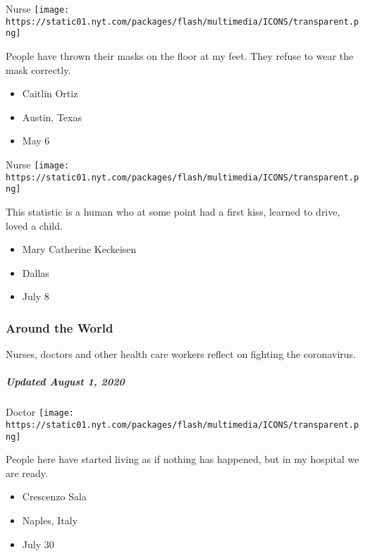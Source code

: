 \protect\hyperlink{item-caitlin-ortiz}{}

Nurse
\texttt{[image: https://static01.nyt.com/packages/flash/multimedia/ICONS/transparent.png]}

People have thrown their masks on the floor at my feet. They refuse to
wear the mask correctly.

\begin{itemize}
\tightlist
\item
  Caitlin Ortiz
\item
  Austin, Texas
\item
  May 6
\end{itemize}

\protect\hyperlink{item-mary-catherine-keckeisen}{}

Nurse
\texttt{[image: https://static01.nyt.com/packages/flash/multimedia/ICONS/transparent.png]}

This statistic is a human who at some point had a first kiss, learned to
drive, loved a child.

\begin{itemize}
\tightlist
\item
  Mary Catherine Keckeisen
\item
  Dallas
\item
  July 8
\end{itemize}

\hypertarget{around-the-world}{%
\subsubsection{Around the World}\label{around-the-world}}

Nurses, doctors and other health care workers reflect on fighting the
coronavirus.

\hypertarget{updated-august-1-2020-1}{%
\subparagraph{Updated August 1, 2020}\label{updated-august-1-2020-1}}

\protect\hyperlink{item-crescenzo-sala}{}

Doctor
\texttt{[image: https://static01.nyt.com/packages/flash/multimedia/ICONS/transparent.png]}

People here have started living as if nothing has happened, but in my
hospital we are ready.

\begin{itemize}
\tightlist
\item
  Crescenzo Sala
\item
  Naples, Italy
\item
  July 30
\end{itemize}


